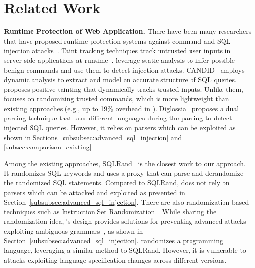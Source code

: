 \section{Related Work}
\label{sec:related}

\noindent
{\bf Runtime Protection of Web Application.}
There have been many researchers that have proposed runtime protection systems against command and SQL injection attacks~\cite{nguyen-tuong-sql,  Haldar_2005, chin_2009, csse, sqlcheck, sqlrand, halfond06fse, halfond_wasp, sekar_ndss, AMNESIA, CANDID}. 
Taint tracking techniques track untrusted user inputs in server-side applications at runtime~\cite{nguyen-tuong-sql,  Haldar_2005, chin_2009, csse, sqlcheck}.
\cite{sekar_ndss,  AMNESIA} leverage static analysis to infer possible benign commands and use them to detect injection attacks. 
CANDID~\cite{CANDID}  employs dynamic analysis to extract and model an accurate structure of SQL queries. %
%
\cite{halfond06fse} proposes positive tainting that dynamically tracks trusted inputs.  Unlike them, \sysname focuses on randomizing trusted commands, which is more lightweight than existing approaches (e.g., up to 19\% overhead in \cite{halfond06fse}).
Diglossia~\cite{diglossia} proposes a dual parsing technique that uses different languages during the parsing to detect injected SQL queries. However, it relies on parsers which can be exploited as shown in Sections~\ref{subsubsec:advanced_sql_injection} and \ref{subsec:comparison_existing}. 

Among the existing approaches, SQLRand~\cite{sqlrand, autorand} is the closest work to our approach. It randomizes SQL keywords and uses a proxy that can parse and derandomize the randomized SQL statements. %
%
Compared to SQLRand, \sysname does not rely on parsers which can be attacked and exploited as presented in Section~\ref{subsubsec:advanced_sql_injection}. 
%
There are also randomization based techniques such as Instruction Set Randomization~\cite{isr, isr2, isr3}. 
While sharing the randomization idea, \sysname's design provides solutions for preventing advanced attacks exploiting ambiguous grammars~\cite{sql_dialect}, as shown in Section~\ref{subsubsec:advanced_sql_injection}.
\cite{isr2} randomizes a programming language, leveraging a similar method to SQLRand. However, it is vulnerable to attacks exploiting language specification changes across different versions. %

